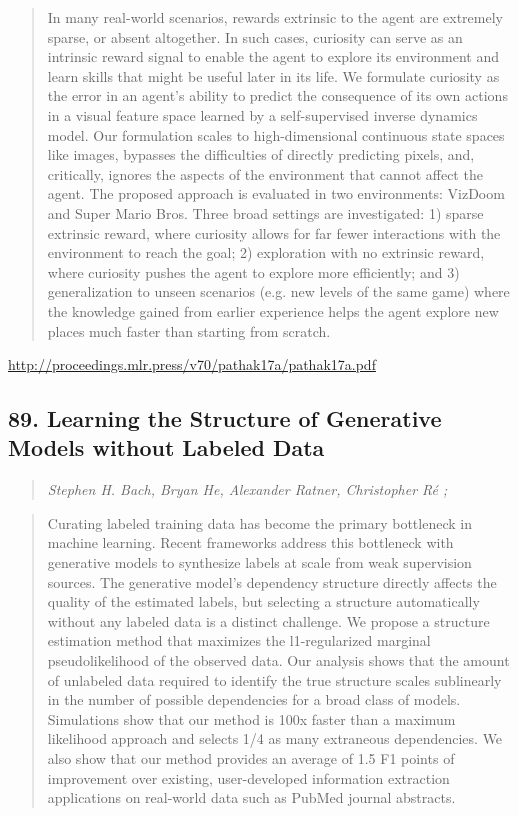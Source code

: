 \documentclass{article}
\begin{document}
\begin{quote}
    In many real-world scenarios, rewards extrinsic to the agent are extremely sparse, or absent altogether. In such cases, curiosity can serve as an intrinsic reward signal to enable the agent to explore its environment and learn skills that might be useful later in its life. We formulate curiosity as the error in an agent’s ability to predict the consequence of its own actions in a visual feature space learned by a self-supervised inverse dynamics model. Our formulation scales to high-dimensional continuous state spaces like images, bypasses the difficulties of directly predicting pixels, and, critically, ignores the aspects of the environment that cannot affect the agent. The proposed approach is evaluated in two environments: VizDoom and Super Mario Bros. Three broad settings are investigated: 1) sparse extrinsic reward, where curiosity allows for far fewer interactions with the environment to reach the goal; 2) exploration with no extrinsic reward, where curiosity pushes the agent to explore more efficiently; and 3) generalization to unseen scenarios (e.g. new levels of the same game) where the knowledge gained from earlier experience helps the agent explore new places much faster than starting from scratch.  \end{quote}

\href{http://proceedings.mlr.press/v70/pathak17a/pathak17a.pdf}{http://proceedings.mlr.press/v70/pathak17a/pathak17a.pdf}

\subsection{89. Learning the Structure of Generative Models without Labeled Data}

\begin{quote}
\footnotesize{\textit{Stephen H. Bach, Bryan He, Alexander Ratner, Christopher Ré ;}}
\end{quote}

\begin{quote}
    Curating labeled training data has become the primary bottleneck in machine learning. Recent frameworks address this bottleneck with generative models to synthesize labels at scale from weak supervision sources. The generative model’s dependency structure directly affects the quality of the estimated labels, but selecting a structure automatically without any labeled data is a distinct challenge. We propose a structure estimation method that maximizes the l1-regularized marginal pseudolikelihood of the observed data. Our analysis shows that the amount of unlabeled data required to identify the true structure scales sublinearly in the number of possible dependencies for a broad class of models. Simulations show that our method is 100x faster than a maximum likelihood approach and selects 1/4 as many extraneous dependencies. We also show that our method provides an average of 1.5 F1 points of improvement over existing, user-developed information extraction applications on real-world data such as PubMed journal abstracts.  \end{quote}
\end{document}
